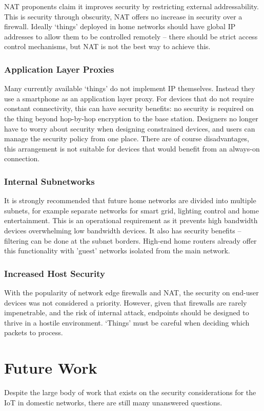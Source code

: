 \documentclass[10pt,journal,compsoc]{IEEEtran}
\begin{document}
NAT proponents claim it improves security by restricting external
addressability. This is security through obscurity, NAT offers no increase in
security over a firewall. Ideally `things' deployed in home networks should
have global IP addresses to allow them to be controlled remotely -- there
should be strict access control mechanisms, but NAT is not the best way to
achieve this. 

\subsubsection{Application Layer Proxies}
Many currently available `things' do not implement IP themselves. Instead they
use a smartphone as an application layer proxy. For devices that do not require
constant connectivity, this can have security benefits: no security is required
on the thing beyond hop-by-hop encryption to the base station.  Designers no
longer have to worry about security when designing constrained devices, and
users can manage the security policy from one place. There are of course
disadvantages, this arrangement is not suitable for devices that would benefit
from an always-on connection. 

\subsubsection{Internal Subnetworks}
It is strongly recommended that future home networks are divided into multiple
subnets, for example separate networks for smart grid, lighting control and
home entertainment. This is an operational requirement as it prevents high
bandwidth devices overwhelming low bandwidth devices. It also has security
benefits -- filtering can be done at the subnet borders. High-end home routers
already offer this functionality with 'guest' networks isolated from the main
network.

\subsubsection{Increased Host Security}
With the popularity of network edge firewalls and NAT, the security on end-user
devices was not considered a priority. However, given that firewalls are rarely
impenetrable, and the risk of internal attack, endpoints should be designed to
thrive in a hostile environment. `Things' must be careful when deciding which
packets to process.


\section{Future Work}
Despite the large body of work that exists on the security considerations for
the IoT in domestic networks, there are still many unanswered questions. 
\end{document}
